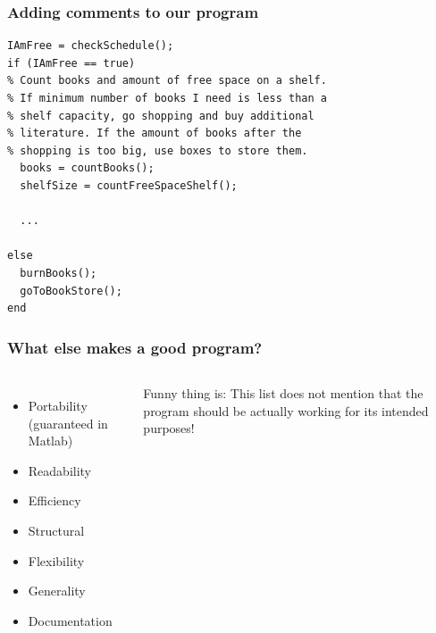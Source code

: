 \begin{frame}[fragile]
 \frametitle{Adding comments to our program}
 \centering{}
 \begin{lstlisting}
IAmFree = checkSchedule();
if (IAmFree == true)
% Count books and amount of free space on a shelf. 
% If minimum number of books I need is less than a 
% shelf capacity, go shopping and buy additional 
% literature. If the amount of books after the 
% shopping is too big, use boxes to store them.
  books = countBooks();
  shelfSize = countFreeSpaceShelf();
  
  ...

else
  burnBooks();
  goToBookStore();
end
 \end{lstlisting}
\end{frame}


\begin{frame}
  \frametitle{What else makes a good program?}
  \begin{columns}[T]
        \begin{itemize}
            \item Portability (guaranteed in Matlab)
            \item Readability
            \item Efficiency 
            \item Structural
            \item Flexibility
            \item Generality
            \item Documentation
        \end{itemize}
Funny thing is: This list does not mention that the program should be actually working for its intended purposes!
    \end{columns}
\end{frame}


